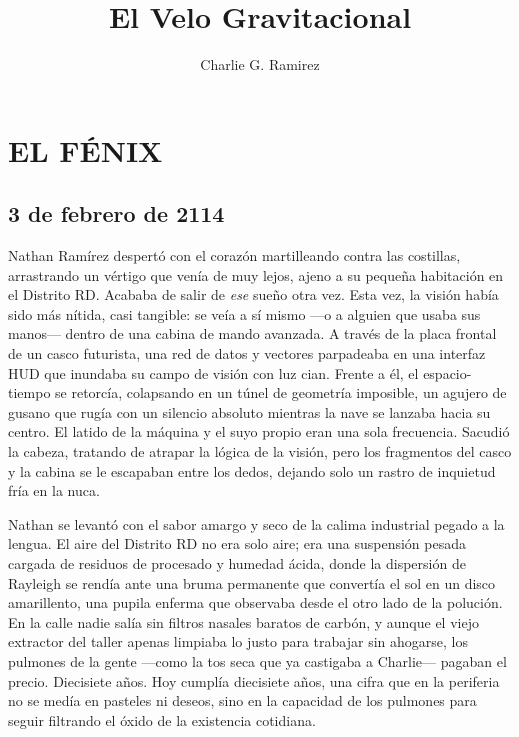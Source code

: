 \documentclass[11pt,twoside]{book}
\title{\textbf{El Velo Gravitacional}}
\author{Charlie G. Ramirez}
\date{} %
\begin{document}
\maketitle

\frontmatter
\tableofcontents

\mainmatter

\chapter{EL FÉNIX}

\section*{3 de febrero de 2114}

Nathan Ramírez despertó con el corazón martilleando contra las costillas, arrastrando un vértigo que venía de muy lejos, ajeno a su pequeña habitación en el Distrito RD. Acababa de salir de \textit{ese} sueño otra vez. Esta vez, la visión había sido más nítida, casi tangible: se veía a sí mismo ---o a alguien que usaba sus manos--- dentro de una cabina de mando avanzada. A través de la placa frontal de un casco futurista, una red de datos y vectores parpadeaba en una interfaz HUD que inundaba su campo de visión con luz cian. Frente a él, el espacio-tiempo se retorcía, colapsando en un túnel de geometría imposible, un agujero de gusano que rugía con un silencio absoluto mientras la nave se lanzaba hacia su centro. El latido de la máquina y el suyo propio eran una sola frecuencia. Sacudió la cabeza, tratando de atrapar la lógica de la visión, pero los fragmentos del casco y la cabina se le escapaban entre los dedos, dejando solo un rastro de inquietud fría en la nuca.

Nathan se levantó con el sabor amargo y seco de la calima industrial pegado a la lengua. El aire del Distrito RD no era solo aire; era una suspensión pesada cargada de residuos de procesado y humedad ácida, donde la dispersión de Rayleigh se rendía ante una bruma permanente que convertía el sol en un disco amarillento, una pupila enferma que observaba desde el otro lado de la polución. En la calle nadie salía sin filtros nasales baratos de carbón, y aunque el viejo extractor del taller apenas limpiaba lo justo para trabajar sin ahogarse, los pulmones de la gente ---como la tos seca que ya castigaba a Charlie--- pagaban el precio. Diecisiete años. Hoy cumplía diecisiete años, una cifra que en la periferia no se medía en pasteles ni deseos, sino en la capacidad de los pulmones para seguir filtrando el óxido de la existencia cotidiana.
\end{document}
